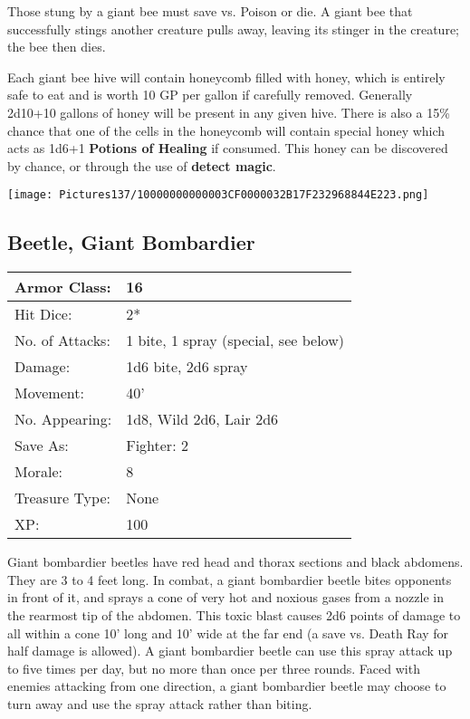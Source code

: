 \documentclass[a4paper,twoside,openany,10pt]{book}
\begin{document}
\begin{multicols}{2}
Those stung by a giant bee must save vs. Poison or die. A giant bee that successfully stings another creature pulls away, leaving its stinger in the creature; the bee then dies.

Each giant bee hive will contain honeycomb filled with honey, which is entirely safe to eat and is worth 10 GP per gallon if carefully removed. Generally 2d10+10 gallons of honey will be present in any given hive. There is also a 15\% chance that one of the cells in the honeycomb will contain special honey which acts as 1d6+1 \textbf{Potions of Healing} if consumed. This honey can be discovered by chance, or through the use of \textbf{detect magic}.

\begin{center}
	\texttt{[image: Pictures137/10000000000003CF0000032B17F232968844E223.png]}
\end{center}

\subsection*{Beetle, Giant Bombardier}\label{beetle-giant-bombardier}

\begin{tabularx}{0.48\textwidth}{@{}lX@{}}
Armor Class: & 16 \\\hline
Hit Dice: & 2* \\\hline
No. of Attacks: & 1 bite, 1 spray (special, see below) \\\hline
Damage: & 1d6 bite, 2d6 spray \\\hline
Movement: & 40' \\\hline
No. Appearing: & 1d8, Wild 2d6, Lair 2d6 \\\hline
Save As: & Fighter: 2 \\\hline
Morale: & 8 \\\hline
Treasure Type: & None \\\hline
XP: & 100 \\\hline
\end{tabularx}\medskip

Giant bombardier beetles have red head and thorax sections and black abdomens. They are 3 to 4 feet long. In combat, a giant bombardier beetle bites opponents in front of it, and sprays a cone of very hot and noxious gases from a nozzle in the rearmost tip of the abdomen. This toxic blast causes 2d6 points of damage to all within a cone 10' long and 10' wide at the far end (a save vs. Death Ray for half damage is allowed). A giant bombardier beetle can use this spray attack up to five times per day, but no more than once per three rounds. Faced with enemies attacking from one direction, a giant bombardier beetle may choose to turn away and use the spray attack rather than biting. 


\end{multicols}
\end{document}
